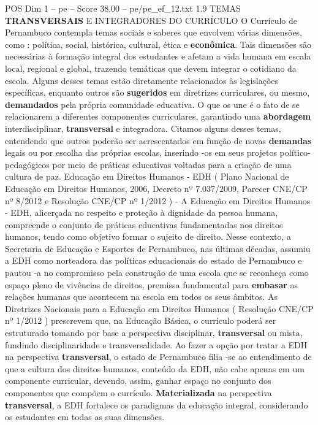 \begin{textsample}{POS Dim 1 – pe – Score 38.00 – pe/pe\_ef\_12.txt}  \label{ex:f1_pos_246}
1.9 TEMAS \textbf{TRANSVERSAIS} E INTEGRADORES DO CURRÍCULO O Currículo de Pernambuco contempla temas sociais e saberes que envolvem várias dimensões, como : política, social, histórica, cultural, ética e \textbf{econômica}.
Tais dimensões são necessárias à formação integral dos estudantes e afetam a vida humana em escala local, regional e global, trazendo temáticas que devem integrar o cotidiano da escola.
Alguns desses temas estão diretamente relacionados às legislações específicas, enquanto outros são \textbf{sugeridos} em diretrizes curriculares, ou mesmo, \textbf{demandados} pela própria comunidade educativa.
O que os une é o fato de se relacionarem a diferentes componentes curriculares, garantindo uma \textbf{abordagem} interdisciplinar, \textbf{transversal} e integradora.
Citamos alguns desses temas, entendendo que outros poderão ser acrescentados em função de novas \textbf{demandas} legais ou por escolha das próprias escolas, inserindo -os em seus projetos político-pedagógicos por meio de práticas educativas voltadas para a criação de uma cultura de paz.
Educação em Direitos Humanos - EDH ( Plano Nacional de Educação em Direitos Humanos, 2006, Decreto nº 7.037/2009, Parecer CNE/CP nº 8/2012 e Resolução CNE/CP nº 1/2012 ) - A Educação em Direitos Humanos - EDH, alicerçada no respeito e proteção à dignidade da pessoa humana, compreende o conjunto de práticas educativas fundamentadas nos direitos humanos, tendo como objetivo formar o sujeito de direito.
Nesse contexto, a Secretaria de Educação e Esportes de Pernambuco, nas últimas décadas, assumiu a EDH como norteadora das políticas educacionais do estado de Pernambuco e pautou -a no compromisso pela construção de uma escola que se reconheça como espaço pleno de vivências de direitos, premissa fundamental para \textbf{embasar} as relações humanas que acontecem na escola em todos os seus âmbitos.
As Diretrizes Nacionais para a Educação em Direitos Humanos ( Resolução CNE/CP nº 1/2012 ) prescrevem que, na Educação Básica, o currículo poderá ser estruturado tomando por base a perspectiva disciplinar, \textbf{transversal} ou mista, fundindo disciplinaridade e transversalidade.
Ao fazer a opção por tratar a EDH na perspectiva \textbf{transversal}, o estado de Pernambuco filia -se ao entendimento de que a cultura dos direitos humanos, conteúdo da EDH, não cabe apenas em um componente curricular, devendo, assim, ganhar espaço no conjunto dos componentes que compõem o currículo. \textbf{Materializada} na perspectiva \textbf{transversal}, a EDH fortalece os paradigmas da educação integral, considerando os estudantes em todas as suas dimensões.

\end{textsample}
